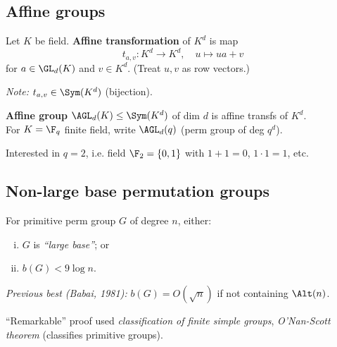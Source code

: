 \subsection{Affine groups}

\begin{slide}
    \begin{definition}
        \vspace{0pt}
        Let $K$ be field. \textbf{Affine transformation} of $K^d$ is map
        $$t_{a,v} : K^d \to K^d, \quad u \mapsto ua + v$$
        for $a \in \GL_d(K)$ and $v \in K^d$. (Treat $u,v$ as row vectors.)
    \end{definition} \pause

    \textit{Note:} $t_{a,v} \in \Sym(K^d)$ (bijection). \pause

    \begin{definition}
        \vspace{0pt}
        \textbf{Affine group} $\AGL_d(K) \leq \Sym(K^d)$ of dim $d$ is affine transfs of $K^d$. \\
        For $K = \F_q$ finite field, write $\AGL_d(q)$ (perm group of deg $q^d$).
    \end{definition} \pause

    Interested in $q = 2$, i.e. field $\F_2 = \{0,1\}$ with $1 + 1 = 0$, $1 \cdot 1 = 1$, etc.
\end{slide}

\subsection{Non-large base permutation groups}

\begin{slide}

    \begin{theorem}[Liebeck, 1984]
        \vspace{0pt}
        For primitive perm group $G$ of degree $n$, either:
        \begin{enumerate}[(i)]
            \item $G$ is \textit{``large base''}; or
            \item $b(G) < 9\log n$.
        \end{enumerate}
    \end{theorem} \pause

    \textit{Previous best (Babai, 1981):} $b(G) = O(\sqrt{n})$ if not containing $\Alt(n)$.

    ``Remarkable'' proof used \textit{classification of finite simple groups}, \textit{O'Nan-Scott theorem} (classifies primitive groups).
\end{slide}

